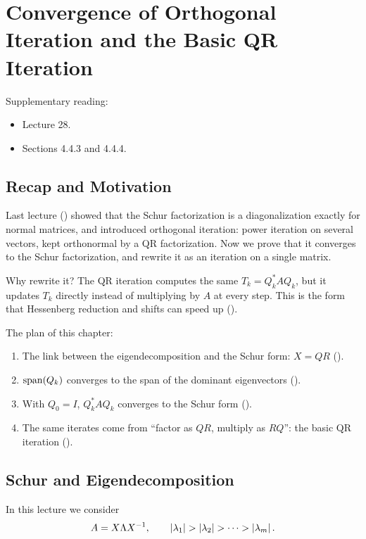 \chapter{Convergence of Orthogonal Iteration and the Basic QR Iteration}
\label{ch:qr-alg}

Supplementary reading:
\begin{itemize}
  \item \cite{TB} Lecture 28.
  \item \cite{Demmel} Sections 4.4.3 and 4.4.4.
\end{itemize}

\section{Recap and Motivation}

Last lecture () showed that the Schur factorization is a diagonalization exactly for normal matrices, and introduced orthogonal iteration: power iteration on several vectors, kept orthonormal by a QR factorization. Now we prove that it converges to the Schur factorization, and rewrite it as an iteration on a single matrix.

Why rewrite it? The QR iteration computes the same $T_k = Q_k^\ast AQ_k$, but it updates $T_k$ directly instead of multiplying by $A$ at every step. This is the form that Hessenberg reduction and shifts can speed up ().

The plan of this chapter:
\begin{enumerate}
  \item The link between the eigendecomposition and the Schur form: $X = QR$ ().
  \item $\operatorname{span}(Q_k)$ converges to the span of the dominant eigenvectors ().
  \item With $Q_0 = I$, $Q_k^\ast AQ_k$ converges to the Schur form ().
  \item The same iterates come from ``factor as $QR$, multiply as $RQ$'': the basic QR iteration ().
\end{enumerate}

\section{Schur and Eigendecomposition}
\label{sec:schur-eig}

In this lecture we consider
\begin{equation}
  A = X\Lambda X^{-1}, \qquad \left\lvert \lambda_1 \right\rvert > \left\lvert \lambda_2 \right\rvert > \dots > \left\lvert \lambda_m \right\rvert.
  \label{eq:qr-alg-assumption}
\end{equation}

